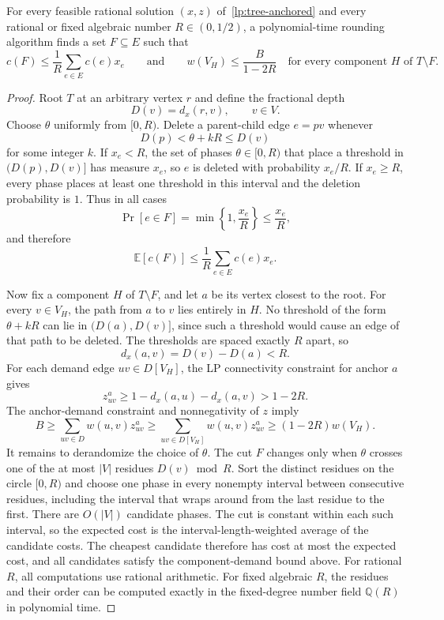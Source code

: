\begin{theorem}\label{thm:tree-anchored-rounding}
    For every feasible rational solution $(x,z)$ of~\eqref{lp:tree-anchored} and every rational or fixed algebraic number $R\in(0,1/2)$, a polynomial-time rounding algorithm finds a set $F\subseteq E$ such that
    \[
        c(F)\leq\frac{1}{R}\sum_{e\in E}c(e)x_e
        \qquad\text{and}\qquad
        w(V_H)\leq\frac{B}{1-2R}
        \quad\text{for every component }H\text{ of }T\setminus F.
    \]
\end{theorem}
\begin{proof}
    Root $T$ at an arbitrary vertex $r$ and define the fractional depth
    \[
        D(v)=d_x(r,v),\qquad v\in V.
    \]
    Choose $\theta$ uniformly from $[0,R)$. Delete a parent-child edge $e=pv$ whenever
    \[
        D(p)<\theta+kR\leq D(v)
    \]
    for some integer $k$. If $x_e<R$, the set of phases $\theta\in[0,R)$ that place a threshold in $(D(p),D(v)]$ has measure $x_e$, so $e$ is deleted with probability $x_e/R$. If $x_e\geq R$, every phase places at least one threshold in this interval and the deletion probability is $1$. Thus in all cases
    \[
        \Pr[e\in F]=\min\left\{1,\frac{x_e}{R}\right\}\leq\frac{x_e}{R},
    \]
    and therefore
    \[
        \mathbb{E}[c(F)]\leq\frac{1}{R}\sum_{e\in E}c(e)x_e.
    \]

    Now fix a component $H$ of $T\setminus F$, and let $a$ be its vertex closest to the root. For every $v\in V_H$, the path from $a$ to $v$ lies entirely in $H$. No threshold of the form $\theta+kR$ can lie in $(D(a),D(v)]$, since such a threshold would cause an edge of that path to be deleted. The thresholds are spaced exactly $R$ apart, so
    \[
        d_x(a,v)=D(v)-D(a)<R.
    \]
    For each demand edge $uv\in D[V_H]$, the LP connectivity constraint for anchor $a$ gives
    \[
        z^a_{uv}\geq1-d_x(a,u)-d_x(a,v)>1-2R.
    \]
    The anchor-demand constraint and nonnegativity of $z$ imply
    \[
        B\geq\sum_{uv\in D}w(u,v)z^a_{uv}
          \geq\sum_{uv\in D[V_H]}w(u,v)z^a_{uv}
          \geq(1-2R)w(V_H).
    \]
    It remains to derandomize the choice of $\theta$. The cut $F$ changes only when $\theta$ crosses one of the at most $|V|$ residues $D(v)\bmod R$. Sort the distinct residues on the circle $[0,R)$ and choose one phase in every nonempty interval between consecutive residues, including the interval that wraps around from the last residue to the first. There are $O(|V|)$ candidate phases. The cut is constant within each such interval, so the expected cost is the interval-length-weighted average of the candidate costs. The cheapest candidate therefore has cost at most the expected cost, and all candidates satisfy the component-demand bound above. For rational $R$, all computations use rational arithmetic. For fixed algebraic $R$, the residues and their order can be computed exactly in the fixed-degree number field $\mathbb{Q}(R)$ in polynomial time.
\end{proof}

